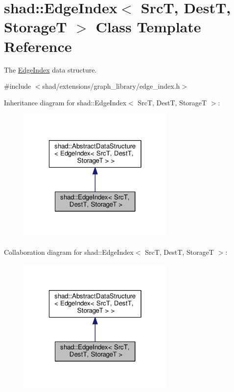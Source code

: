 \hypertarget{classshad_1_1EdgeIndex}{\section{shad\-:\-:Edge\-Index$<$ Src\-T, Dest\-T, Storage\-T $>$ Class Template Reference}
\label{classshad_1_1EdgeIndex}
}


The \hyperlink{classshad_1_1EdgeIndex}{Edge\-Index} data structure.  




{\ttfamily \#include $<$shad/extensions/graph\-\_\-library/edge\-\_\-index.\-h$>$}



Inheritance diagram for shad\-:\-:Edge\-Index$<$ Src\-T, Dest\-T, Storage\-T $>$\-:
\nopagebreak
\begin{figure}[H]
\begin{center}
\leavevmode
\includegraphics[width=220pt]{classshad_1_1EdgeIndex__inherit__graph}
\end{center}
\end{figure}


Collaboration diagram for shad\-:\-:Edge\-Index$<$ Src\-T, Dest\-T, Storage\-T $>$\-:
\nopagebreak
\begin{figure}[H]
\begin{center}
\leavevmode
\includegraphics[width=220pt]{classshad_1_1EdgeIndex__coll__graph}
\end{center}
\end{figure}

